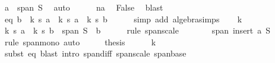 \begin{isabellebody}
\ {\isachardoublequoteopen}a\ {\isasymin}\ span\ S{\isachardoublequoteclose}\ \isamarkupfalse%
\ auto\isanewline
\ \ \ \ \isamarkupfalse%
\ na\ \isamarkupfalse%
\ False\ \isamarkupfalse%
\ blast\ \ \isanewline
\ \ \isamarkupfalse%
\isanewline
\ \ \isamarkupfalse%
\ \isamarkupfalse%
\ eq{\isacharcolon}{\kern0pt}\ {\isachardoublequoteopen}b\ {\isacharequal}{\kern0pt}\ {\isacharparenleft}{\kern0pt}{}{\isacharslash}{\kern0pt}k{\isacharparenright}{\kern0pt}\ {\isacharasterisk}{\kern0pt}s\ a\ {\isacharminus}{\kern0pt}\ {\isacharparenleft}{\kern0pt}{}{\isacharslash}{\kern0pt}k{\isacharparenright}{\kern0pt}\ {\isacharasterisk}{\kern0pt}s\ {\isacharparenleft}{\kern0pt}a\ {\isacharminus}{\kern0pt}\ k\ {\isacharasterisk}{\kern0pt}s\ b{\isacharparenright}{\kern0pt}{\isachardoublequoteclose}\isanewline
\ \ \ \ \isamarkupfalse%
\ {\isacharparenleft}{\kern0pt}simp\ add{\isacharcolon}{\kern0pt}\ algebra{\isacharunderscore}{\kern0pt}simps{\isacharparenright}{\kern0pt}\isanewline
\isanewline
\ \ \isamarkupfalse%
\ k\ \isamarkupfalse%
\ {\isachardoublequoteopen}{\isacharparenleft}{\kern0pt}{}{\isacharslash}{\kern0pt}k{\isacharparenright}{\kern0pt}\ {\isacharasterisk}{\kern0pt}s\ {\isacharparenleft}{\kern0pt}a\ {\isacharminus}{\kern0pt}\ k\ {\isacharasterisk}{\kern0pt}s\ b{\isacharparenright}{\kern0pt}\ {\isasymin}\ span\ {\isacharparenleft}{\kern0pt}S\ {\isacharminus}{\kern0pt}\ {\isacharbraceleft}{\kern0pt}b{\isacharbraceright}{\kern0pt}{\isacharparenright}{\kern0pt}{\isachardoublequoteclose}\isanewline
\ \ \ \ \isamarkupfalse%
\ {\isacharparenleft}{\kern0pt}rule\ span{\isacharunderscore}{\kern0pt}scale{\isacharparenright}{\kern0pt}\isanewline
\ \ \isamarkupfalse%
\ \isamarkupfalse%
\ {\isachardoublequoteopen}{\isachardot}{\kern0pt}{\isachardot}{\kern0pt}{\isachardot}{\kern0pt}\ {\isasymsubseteq}\ span\ {\isacharparenleft}{\kern0pt}insert\ a\ S{\isacharparenright}{\kern0pt}{\isachardoublequoteclose}\isanewline
\ \ \ \ \isamarkupfalse%
\ {\isacharparenleft}{\kern0pt}rule\ span{\isacharunderscore}{\kern0pt}mono{\isacharparenright}{\kern0pt}\ auto\isanewline
\ \ \isamarkupfalse%
\ \isamarkupfalse%
\ {\isacharquery}{\kern0pt}thesis\isanewline
\ \ \ \ \isamarkupfalse%
\ k\ \isamarkupfalse%
\ {\isacharparenleft}{\kern0pt}subst\ eq{\isacharparenright}{\kern0pt}\ {\isacharparenleft}{\kern0pt}blast\ intro{\isacharcolon}{\kern0pt}\ span{\isacharunderscore}{\kern0pt}diff\ span{\isacharunderscore}{\kern0pt}scale\ span{\isacharunderscore}{\kern0pt}base{\isacharparenright}{\kern0pt}\isanewline

\end{isabellebody}
